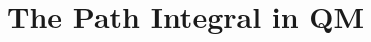 \documentclass[12pt, oneside]{article}   	%
\theoremstyle{definition}
\begin{document}




	
	
	
	

\section*{The Path Integral in QM}
\end{document}

